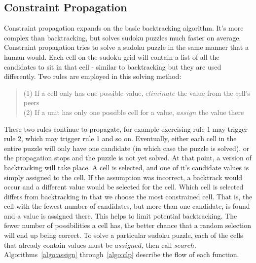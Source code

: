 \subsection{Constraint Propagation}
Constraint propagation expands on the basic backtracking algorithm. It's more complex than backtracking, but solves sudoku puzzles
much faster on average. Constraint propagation tries to solve a sudoku puzzle in the same manner that a human would. Each cell on
the sudoku grid will contain a list of all the candidates to sit in that cell - similar to backtracking but they are used differently.
Two rules are employed in this solving method:
\begin{verse}
    (1) If a cell only has one possible value, $eliminate$ the value from the cell's peers \\
    (2) If a unit has only one possible cell for a value, $assign$ the value there
\end{verse}
These two rules continue to propagate, for example exercising rule 1 may trigger rule 2, which may trigger rule 1 and so on. Eventually,
either each cell in the entire puzzle will only have one candidate (in which case the puzzle is solved), or the propagation stops and the
puzzle is not yet solved. At that point, a version of backtracking will take place. A cell is selected, and one of it's candidate values
is simply assigned to the cell. If the assumption was incorrect, a backtrack would occur and a different value would be selected for the cell.
Which cell is selected differs from backtracking in that we choose the most constrained cell. That is, the cell with the fewest number of
candidates, but more than one candidate, is found and a value is assigned there. This helps to limit potential backtracking. The fewer number
of possibilities a cell has, the better chance that a random selection will end up being correct. 
To solve a particular sudoku puzzle, each of the cells that already contain values must be $assigned$, then call $search$.
Algorithms~\ref{algo:assign} through~\ref{algo:clp} describe the flow of each function.
